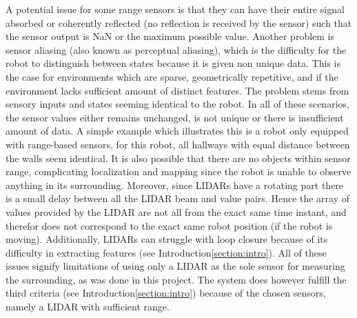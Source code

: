 A potential issue for some range sensors is that they can have their entire signal absorbed or coherently reflected (no reflection is received by the sensor) such that the sensor output is NaN or the maximum possible value\:\cite{siegwart_introduction_2011}\cite{corke_robotics_2023}.
Another problem is sensor aliasing (also known as perceptual aliasing\:\cite{cadena_past_2016}), which is the difficulty for the robot to distinguish between states because it is given non unique data\:\cite{siegwart_introduction_2011}. This is the case for environments which are sparse, geometrically repetitive, and if the environment lacks sufficient amount of distinct features\:\cite{cai_lidarinertial_2023}.
The problem stems from sensory inputs and states seeming identical to the robot\:\cite{siegwart_introduction_2011}. In all of these scenarios, the sensor values either remains unchanged, is not unique or there is insufficient amount of data\:\cite{cai_lidarinertial_2023}\cite{siegwart_introduction_2011}.
A simple example which illustrates this is a robot only equipped with range-based sensors, for this robot, all hallways with equal distance between the walls seem identical. 
It is also possible that there are no objects within sensor range, complicating localization and mapping since the robot is unable to observe anything in its surrounding\:\cite{siegwart_introduction_2011}\cite{corke_robotics_2023}.
Moreover, since LIDARs have a rotating part\:\cite{ilas_electronic_2013} there is a small delay between all the LIDAR beam and value pairs. Hence the array of values provided by the LIDAR are not all from the exact same time instant, and therefor does not correspond to the exact same robot position (if the robot is moving).
Additionally, LIDARs can struggle with loop closure because of its difficulty in extracting features (see Introduction\:\ref{section:intro})\:\cite{khan_investigation_2022}.
All of these issues signify limitations of using only a LIDAR as the sole sensor for measuring the surrounding, as was done in this project.
The system does however fulfill the third criteria (see Introduction\:\ref{section:intro}) because of the chosen sensors, namely a LIDAR with sufficient range.


